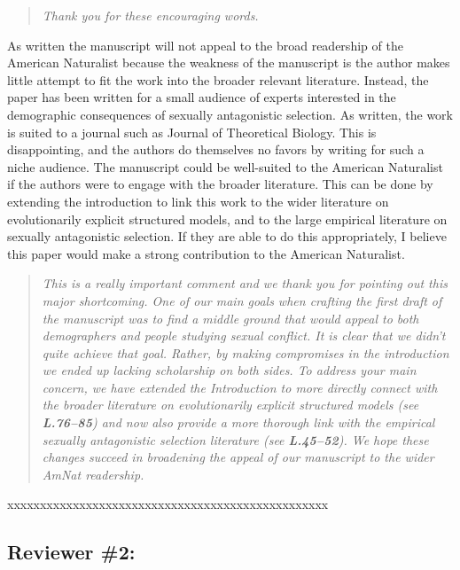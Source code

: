\documentclass[11pt]{article}
\begin{document}
\begin{quote}
	{\itshape Thank you for these encouraging words.}
\end{quote}

As written the manuscript will not appeal to the broad readership of the American Naturalist because the weakness of the manuscript is the author makes little attempt to fit the work into the broader relevant literature. Instead, the paper has been written for a small audience of experts interested in the demographic consequences of sexually antagonistic selection. As written, the work is suited to a journal such as Journal of Theoretical Biology. This is disappointing, and the authors do themselves no favors by writing for such a niche audience. The manuscript could be well-suited to the American Naturalist if the authors were to engage with the broader literature. This can be done by extending the introduction to link this work to the wider literature on evolutionarily explicit structured models, and to the large empirical literature on sexually antagonistic selection. If they are able to do this appropriately, I believe this paper would make a strong contribution to the American Naturalist.

\begin{quote}
	{\itshape This is a really important comment and we thank you for pointing out this major shortcoming. One of our main goals when crafting the first draft of the manuscript was to find a middle ground that would appeal to both demographers and people studying sexual conflict. It is clear that we didn't quite achieve that goal. Rather, by making compromises in the introduction we ended up lacking scholarship on both sides. To address your main concern, we have extended the Introduction to more directly connect with the broader literature on evolutionarily explicit structured models (see {\bf L.76--85}) and now also provide a more thorough link with the empirical sexually antagonistic selection literature (see {\bf L.45--52}). We hope these changes succeed in broadening the appeal of our manuscript to the wider AmNat readership.}
\end{quote}

\noindent xxxxxxxxxxxxxxxxxxxxxxxxxxxxxxxxxxxxxxxxxxxxxxxxx


\subsection*{Reviewer \#2:}
\end{document}
